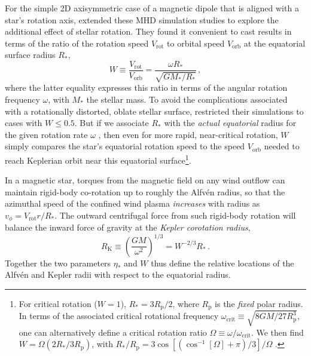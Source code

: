\documentclass[useAMS,usenatbib]{mn2e}
\newcommand{\etas}{\eta_\ast}
\newcommand{\rk}{R_\mathrm{K}}
\newcommand{\rs}{R_\ast}
\newcommand{\ms}{M_\ast}
\newcommand{\rp}{R_\mathrm{p}}
\newcommand{\vrot}{V_\mathrm{rot}}
\newcommand{\vcrit}{V_\mathrm{orb}}
\begin{document}
For the simple 2D axisymmetric case of a magnetic dipole that is aligned with a star's rotation axis,
\citet{2008MNRAS.385...97U}
extended these MHD simulation studies to explore the additional effect of stellar rotation.
They found it convenient to cast results in terms of the ratio of the rotation speed $\vrot$ to orbital speed $\vcrit$ at the equatorial surface radius $\rs$,
\begin{equation}
W \equiv  \frac{\vrot}{\vcrit} = \frac{\omega\rs}{\sqrt{G\ms/\rs}} 
\, ,
\label{eq:wdef}
\end{equation}
where the latter equality expresses this ratio in terms of the angular rotation frequency $\omega$, 
with $\ms$ the  stellar mass.
%
To avoid the complications associated with a rotationally distorted, oblate stellar surface, \citet{2008MNRAS.385...97U}  restricted their simulations to cases with $W \le 0.5$.
But if we associate $\rs$ with the \textit{actual equatorial} radius for the given rotation rate $\omega$ , then even for more rapid,  near-critical rotation, $W$ simply compares the star's equatorial rotation speed to the speed $\vcrit$ needed to reach Keplerian orbit near this equatorial surface\footnote{
For critical rotation ($W=1$), $\rs = 3 \rp /2$, where $\rp$ is the \textit{fixed} polar radius.
In terms of the associated critical rotational frequency 
$\omega_\mathrm{crit}  \equiv \sqrt{8GM/27 \rp^3}$, 
one can alternatively define a critical rotation ratio
 $\Omega\equiv\omega/\omega_\mathrm{crit}$. 
 We then find $W=\Omega (2\rs / 3\rp)$, with
  $\rs / \rp =  3 \cos[(\cos^{-1}[\Omega]+\pi)/3]/\Omega$ \citep{1966ApJ...146..152C}.
}. 


In a magnetic star, torques from the magnetic field on any wind outflow can maintain rigid-body co-rotation up to roughly the  
Alfv\'en radius, so that the azimuthal speed of the confined wind plasma \textit{increases} with radius as $v_\phi = \vrot r/\rs$.
The outward centrifugal force from such rigid-body rotation will balance the inward force of gravity at the
\textit{Kepler corotation radius},
\begin{equation}
\rk \equiv  \left(\frac{GM}{\omega^2}\right)^{1/3} = W^{-2/3} \rs
    \, .
    \label{eq:rkdef}
\end{equation}
Together the two parameters $\etas$ and $W$ thus define the relative locations of the 
Alfv\'en and Kepler radii with respect to the equatorial radius.
\end{document}

